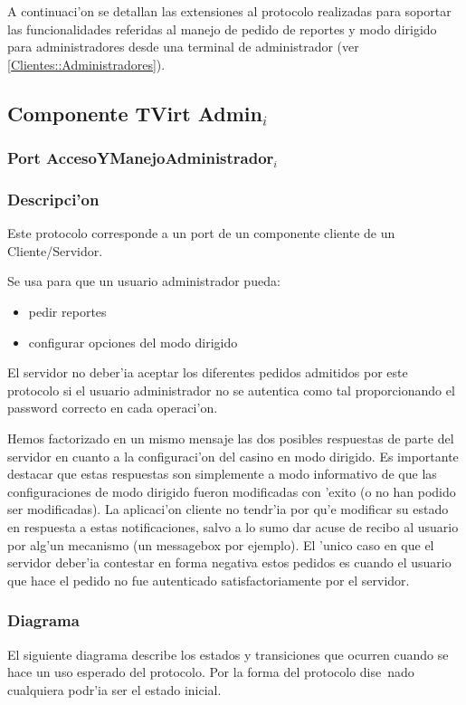 A continuaci'on se detallan las extensiones al protocolo realizadas para soportar las funcionalidades referidas al manejo de pedido de reportes y modo dirigido para administradores desde una terminal de administrador (ver \ref{Clientes::Administradores}).

\subsection{Componente TVirt Admin$_i$} 
\subsubsection{Port AccesoYManejoAdministrador$_i$}

\subsubsection{Descripci'on}

Este protocolo corresponde a un port de un componente cliente de un Cliente/Servidor.

Se usa para que un usuario administrador pueda:
\begin{itemize}
    \item{pedir reportes}
    \item{configurar opciones del modo dirigido}
\end{itemize}

El servidor no deber'ia aceptar los diferentes pedidos admitidos por este protocolo si el usuario administrador no se autentica como tal proporcionando el password correcto en cada operaci'on.

Hemos factorizado en un mismo mensaje las dos posibles respuestas de parte del servidor en cuanto a la configuraci'on del casino en modo dirigido. Es importante destacar que estas respuestas son simplemente a modo informativo de que las configuraciones de modo dirigido fueron modificadas con 'exito (o no han podido ser modificadas). La aplicaci'on cliente no tendr'ia por qu'e modificar su estado en respuesta a estas notificaciones, salvo a lo sumo dar acuse de recibo al usuario por alg'un mecanismo (un messagebox por ejemplo). El 'unico caso en que el servidor deber'ia contestar en forma negativa estos pedidos es cuando el usuario que hace el pedido no fue autenticado satisfactoriamente por el servidor.

\subsubsection{Diagrama}
El siguiente diagrama describe los estados y transiciones que ocurren cuando se hace un uso esperado del protocolo.
Por la forma del protocolo dise~nado cualquiera podr'ia ser el estado inicial.

